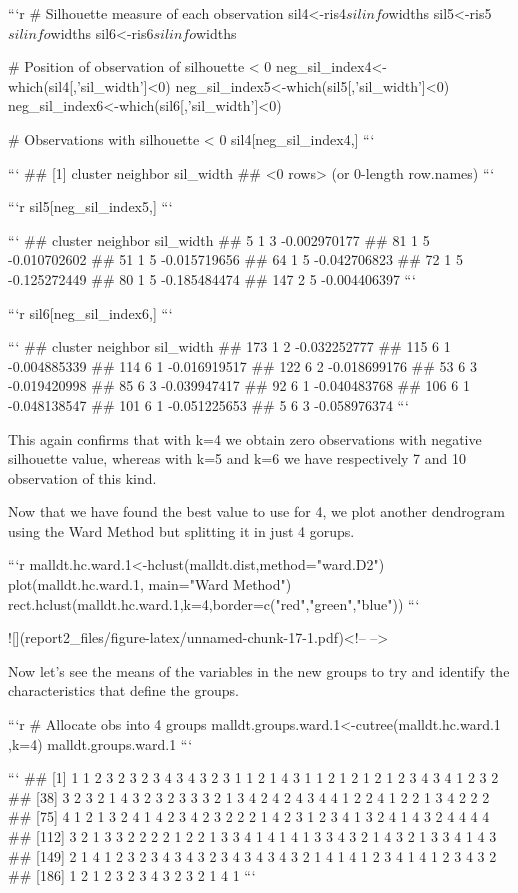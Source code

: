 \documentclass[
]{article}
\begin{document}
\begin{itemize}
```r
# Silhouette measure of each observation
sil4<-ris4$silinfo$widths 
sil5<-ris5$silinfo$widths
sil6<-ris6$silinfo$widths

# Position of observation of silhouette < 0
neg_sil_index4<-which(sil4[,'sil_width']<0)
neg_sil_index5<-which(sil5[,'sil_width']<0)
neg_sil_index6<-which(sil6[,'sil_width']<0)

# Observations with silhouette < 0
sil4[neg_sil_index4,]
```

```
## [1] cluster   neighbor  sil_width
## <0 rows> (or 0-length row.names)
```

```r
sil5[neg_sil_index5,]
```

```
##     cluster neighbor    sil_width
## 5         1        3 -0.002970177
## 81        1        5 -0.010702602
## 51        1        5 -0.015719656
## 64        1        5 -0.042706823
## 72        1        5 -0.125272449
## 80        1        5 -0.185484474
## 147       2        5 -0.004406397
```

```r
sil6[neg_sil_index6,]
```

```
##     cluster neighbor    sil_width
## 173       1        2 -0.032252777
## 115       6        1 -0.004885339
## 114       6        1 -0.016919517
## 122       6        2 -0.018699176
## 53        6        3 -0.019420998
## 85        6        3 -0.039947417
## 92        6        1 -0.040483768
## 106       6        1 -0.048138547
## 101       6        1 -0.051225653
## 5         6        3 -0.058976374
```

This again confirms that with k=4 we obtain zero observations with negative silhouette value, whereas with k=5 and k=6 we have respectively 7 and 10 observation of this kind.

Now that we have found the best value to use for 4, we plot another dendrogram using the Ward Method but splitting it in just 4 gorups.


```r
malldt.hc.ward.1<-hclust(malldt.dist,method="ward.D2") 
plot(malldt.hc.ward.1, main="Ward Method") 
rect.hclust(malldt.hc.ward.1,k=4,border=c("red","green","blue"))
```

![](report2_files/figure-latex/unnamed-chunk-17-1.pdf)<!-- --> 

Now let's see the means of the variables in the new groups to try and identify the characteristics that define the groups.


```r
# Allocate obs into 4 groups
malldt.groups.ward.1<-cutree(malldt.hc.ward.1 ,k=4) 
malldt.groups.ward.1
```

```
##   [1] 1 1 2 3 2 3 2 3 4 3 4 3 2 3 1 1 2 1 4 3 1 1 2 1 2 1 2 1 2 3 4 3 4 1 2 3 2
##  [38] 3 2 3 2 1 4 3 2 3 2 3 3 3 2 1 3 4 2 4 2 4 3 4 4 1 2 2 4 1 2 2 1 3 4 2 2 2
##  [75] 4 1 2 1 3 2 4 1 4 2 3 4 2 3 2 2 2 1 4 2 3 1 2 3 4 1 3 2 4 1 4 3 2 4 4 4 4
## [112] 3 2 1 3 3 2 2 2 2 1 2 2 1 3 3 4 1 4 1 4 1 3 3 4 3 2 1 4 3 2 1 3 3 4 1 4 3
## [149] 2 1 4 1 2 3 2 3 4 3 4 3 2 3 4 3 4 3 4 3 2 1 4 1 4 1 2 3 4 1 4 1 2 3 4 3 2
## [186] 1 2 1 2 3 2 3 4 3 2 3 2 1 4 1
```


\end{itemize}
\end{document}
